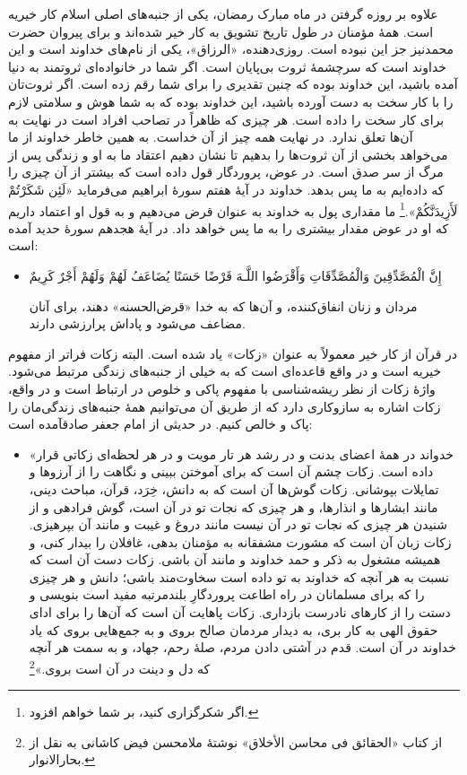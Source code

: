 علاوه بر روزه گرفتن در ماه مبارک رمضان، یکی از جنبه‌های اصلی اسلام کار خیریه است. همهٔ‌ مؤمنان در طول تاریخ تشویق به کار خیر شده‌اند و برای پیروان حضرت محمد{}نیز جز این نبوده است. روزی‌دهنده، «الرزاق»، یکی از نام‌های خداوند است و  این خداوند است که سرچشمهٔ ثروت بی‌پایان است. اگر شما در خانواده‌ای ثروتمند به دنیا آمده باشید، این خداوند بوده که چنین تقدیری را برای شما رقم زده است. اگر ثروت‌تان را با کار سخت به دست آورده باشید، این خداوند بوده که به شما هوش و سلامتی لازم برای کار سخت را داده است. هر چیزی که ظاهراً در تصاحب افراد است در نهایت به آن‌ها تعلق ندارد. در نهایت همه چیز از آن خداست. به همین خاطر خداوند از ما می‌خواهد  بخشی از آن ثروت‌ها را بدهیم تا نشان دهیم اعتقاد ما به او و زندگی پس از مرگ از سر صدق است. در عوض، پروردگار قول داده است که بیشتر از آن چیزی را که داده‌ایم به ما پس بدهد. خداوند در آیهٔ هفتم سورهٔ ابراهیم می‌فرماید {«لَئِن شَكَرْتُمْ لَأَزِيدَنَّكُمْ».}\footnote{اگر شکرگزاری کنید، بر شما خواهم افزود.} ما مقداری پول به خداوند به عنوان قرض  می‌دهیم و به قول او اعتماد داریم که او در عوض مقدار بیشتری را به ما پس خواهد داد. در آیهٔ هجدهم سورهٔ حدید آمده است:

\begin{itemize}
	\item[]
	{
		إِنَّ الْمُصَّدِّقِينَ وَالْمُصَّدِّقَاتِ وَأَقْرَضُوا اللَّـهَ قَرْضًا حَسَنًا يُضَاعَفُ لَهُمْ وَلَهُمْ أَجْرٌ كَرِيمٌ}
	
	{
		مردان و زنان انفاق‌کننده، و آن‌ها که به خدا «قرض‌الحسنه» دهند، برای آنان مضاعف می‌شود و پاداش پرارزشی دارند.}
\end{itemize}

در قرآن از کار خیر معمولاً به عنوان «زکات» یاد شده است. البته زکات فراتر از مفهوم خیریه است و در واقع قاعده‌ای است که به خیلی از جنبه‌های زندگی مرتبط می‌شود. واژهٔ زکات از نظر ریشه‌شناسی با مفهوم پاکی و خلوص در ارتباط است و در واقع، زکات اشاره به سازوکاری دارد که از طریق آن می‌توانیم همهٔ‌ جنبه‌های زندگی‌مان را پاک و خالص کنیم.  در حدیثی از امام جعفر صادق{}آمده است:

\begin{itemize}
	\item[]
	
	{
		«خدواند در همهٔ اعضای بدنت و در رشد هر تار مویت و در هر لحظه‌ای زکاتی قرار داده است. زکات چشم آن است که برای آموختن ببینی و نگاهت را از آرزوها و تمایلات بپوشانی. زکات گوش‌ها آن است که به دانش، خِرَد، قرآن، مباحث دینی، مانند ابشارها و انذارها، و هر چیزی که نجات تو در آن است، گوش فرادهی و از شنیدن هر چیزی که نجات تو در آن نیست مانند دروغ و غیبت و مانند آن بپرهیزی. زکات زبان آن است که مشورت مشفقانه به مؤمنان بدهی، غافلان را بیدار کنی، و همیشه مشغول به ذکر و حمد خداوند و مانند آن باشی. زکات دست آن است که نسبت به هر آنچه که خداوند به تو داده است سخاوت‌مند باشی؛ دانش و هر چیزی را که برای مسلمانان در راه اطاعت پروردگارِ بلندمرتبه مفید است بنویسی و دستت را از کارهای نادرست بازداری. زکات پاهایت آن است که آن‌ها را برای ادای حقوق الهی به کار بری، به دیدار مردمان صالح بروی و به جمع‌هایی بروی که یاد خداوند در آن است. قدم در آشتی دادن مردم، صلهٔ رحم، جهاد، و به سمت هر آنچه که  دل و دینت در آن است بروی.»}\footnote{از کتاب «الحقائق فی محاسن الأخلاق» نوشتهٔ ملامحسن فیض کاشانی به نقل از بحارالانوار.}
\end{itemize}


